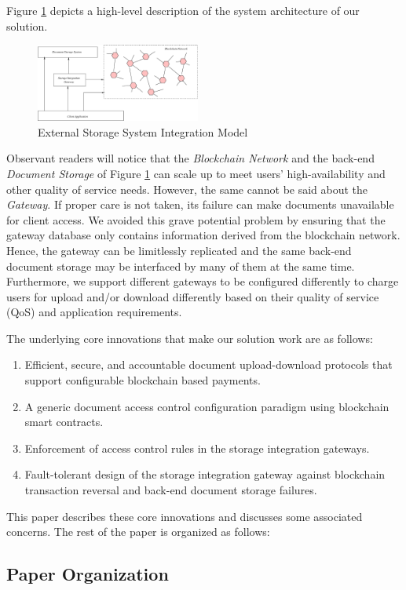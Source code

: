\documentclass[conference]{IEEEtran}
\begin{document}
Figure \ref{fig-1} depicts a high-level description of the system architecture of our solution.   
\begin{figure}[h]
\label{fig-1}
\centering
\includegraphics[width=0.48\textwidth]{system-architecture}                    
\caption{External Storage System Integration Model}
\end{figure}
Observant readers will notice that the \textit{Blockchain Network} and the back-end \textit{Document Storage} of Figure \ref{fig-1} can scale up to meet users' high-availability and other quality of service needs. However, the same cannot be said about the \textit{Gateway}. If proper care is not taken, its failure can make documents unavailable for client access. We avoided this grave potential problem by ensuring that the gateway database only contains information derived from the blockchain network. Hence, the gateway can be limitlessly replicated and the same back-end document storage may be interfaced by many of them at the same time. Furthermore, we support different gateways to be configured differently to charge users for upload and/or download differently based on their quality of service (QoS) and application requirements.

The underlying core innovations that make our solution work are as follows:
\begin{enumerate}
\item Efficient, secure, and accountable document upload-download protocols that support configurable blockchain based payments.
\item A generic document access control configuration paradigm using blockchain smart contracts. 
\item Enforcement of access control rules in the storage integration gateways.
\item Fault-tolerant design of the storage integration gateway against blockchain transaction reversal and back-end document storage failures.   
\end{enumerate}         
This paper describes these core innovations and discusses some associated concerns. The rest of the paper is organized as follows:

\subsection{Paper Organization}
 


\end{document}
